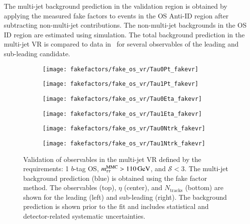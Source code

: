 The multi-jet background prediction in the validation region is
obtained by applying the measured fake factors to events in the OS
Anti-ID region after subtracting non-multi-jet contributions. The
non-multi-jet backgrounds in the OS ID region are estimated using
simulation. The total background prediction in the multi-jet VR is
compared to data in~ for several
observables of the leading and sub-leading \tauhadvis candidate.

\begin{figure}[htbp]
  \centering

  \begin{subfigure}{0.45\textwidth}
    \texttt{[image: fakefactors/fake\_os\_vr/Tau0Pt\_fakevr]}
  \end{subfigure}\hspace*{0.04\textwidth}%
  \begin{subfigure}{0.45\textwidth}
    \texttt{[image: fakefactors/fake\_os\_vr/Tau1Pt\_fakevr]}
  \end{subfigure}

  \begin{subfigure}{0.45\textwidth}
    \texttt{[image: fakefactors/fake\_os\_vr/Tau0Eta\_fakevr]}
  \end{subfigure}\hspace*{0.04\textwidth}%
  \begin{subfigure}{0.45\textwidth}
    \texttt{[image: fakefactors/fake\_os\_vr/Tau1Eta\_fakevr]}
  \end{subfigure}

  \begin{subfigure}{0.45\textwidth}
    \texttt{[image: fakefactors/fake\_os\_vr/Tau0Ntrk\_fakevr]}
  \end{subfigure}\hspace*{0.04\textwidth}%
  \begin{subfigure}{0.45\textwidth}
    \texttt{[image: fakefactors/fake\_os\_vr/Tau1Ntrk\_fakevr]}
  \end{subfigure}

  \caption{Validation of \tauhadvis observables in the multi-jet VR
    defined by the requirements: 1 $b$-tag OS,
    $m_{\tau\tau}^\text{MMC} > \SI{110}{\ensuremath{\text{GeV}}}$, and $\mathcal{S} < 3$. The multi-jet
    background prediction (blue) is obtained using the fake factor
    method. The \tauhadvis observables \pT (top), $\eta$ (center), and
    $N_{\text{tracks}}$ (bottom) are shown for the leading (left) and
    sub-leading \tauhadvis (right). The background prediction is shown
    prior to the fit and includes statistical and detector-related
    systematic uncertainties.}%
  \label{fig:fake_factor_OSVR_kinematics}%
\end{figure}

